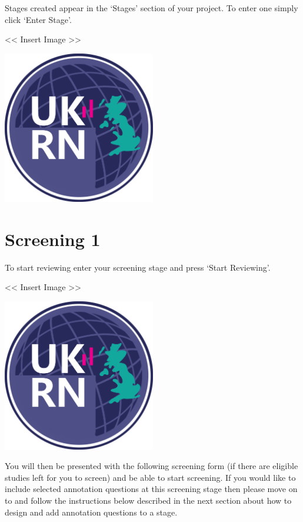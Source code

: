 \documentclass[
]{book}
\begin{document}
Stages created appear in the `Stages' section of your project. To enter one simply click `Enter Stage'.

\textless{}\textless{} Insert Image \textgreater{}\textgreater{}

\includegraphics[width=0.5\textwidth,height=0.5\textheight]{figs/evidence-triangle.png}

\hypertarget{screening-1}{%
\section{Screening 1}\label{screening-1}}

To start reviewing enter your screening stage and press `Start Reviewing'.

\textless{}\textless{} Insert Image \textgreater{}\textgreater{}

\includegraphics[width=0.5\textwidth,height=0.5\textheight]{figs/evidence-triangle.png}

You will then be presented with the following screening form (if there are eligible studies left for you to screen) and be able to start screening. If you would like to include selected annotation questions at this screening stage then please move on to and follow the instructions below described in the next section about how to design and add annotation questions to a stage.
\end{document}
